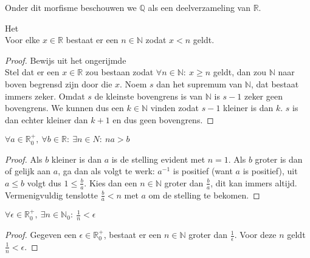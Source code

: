 \documentclass[main.tex]{subfiles}
\begin{document}
\begin{opm}
  Onder dit morfisme beschouwen we $\mathbb{Q}$ als een deelverzameling van $\mathbb{R}$.
\end{opm}


\begin{lem}
  \label{lem:lemma-van-archimedes}
  Het \\
  Voor elke $x\in \mathbb{R}$ bestaat er een $n\in \mathbb{N}$ zodat $x < n$ geldt.

  \begin{proof}
    Bewijs uit het ongerijmde\\
    Stel dat er een $x\in \mathbb{R}$ zou bestaan zodat $\forall n \in \mathbb{N}:\ x \ge n$ geldt, dan zou $\mathbb{N}$ naar boven begrensd zijn door die $x$.
    Noem $s$ dan het supremum van $\mathbb{N}$, dat bestaat immers zeker.\needed
    Omdat $s$ de kleinste bovengrens is van $\mathbb{N}$ is $s-1$ zeker geen bovengrens.
    We kunnen dus een $k\in \mathbb{N}$ vinden zodat $s-1$ kleiner is dan $k$.
    $s$ is dan echter kleiner dan $k+1$ en dus geen bovengrens.
  \end{proof}
\end{lem}

\begin{gev}
  $\forall a \in \mathbb{R}_{0}^{+},\ \forall b\in \mathbb{R}:\ \exists n\in N:\ na > b$

  \begin{proof}
    Als $b$ kleiner is dan $a$ is de stelling evident met $n=1$.
    Als $b$ groter is dan of gelijk aan $a$, ga dan als volgt te werk:
    $a^{-1}$ is positief (want $a$ is positief), uit $a \le b$ volgt dus $1 \le \frac{b}{a}$.
    Kies dan een $n\in \mathbb{N}$ groter dan $\frac{b}{a}$, dit kan immers altijd.
    Vermenigvuldig tenslotte $\frac{b}{a} < n$ met $a$ om de stelling te bekomen.
  \end{proof}
\end{gev}

\begin{gev}
  \label{gev:er-bestaat-alijd-iets-rationaal-kleiner}
  $\forall \epsilon \in \mathbb{R}_{0}^{+},\ \exists n\in \mathbb{N}_{0}:\ \frac{1}{n} < \epsilon$

  \begin{proof}
    Gegeven een $\epsilon \in \mathbb{R}_{0}^{+}$, bestaat er een $n \in \mathbb{N}$ groter dan $\frac{1}{\epsilon}$. 
    Voor deze $n$ geldt $\frac{1}{n} < \epsilon$. 
  \end{proof}
\end{gev}
\end{document}
